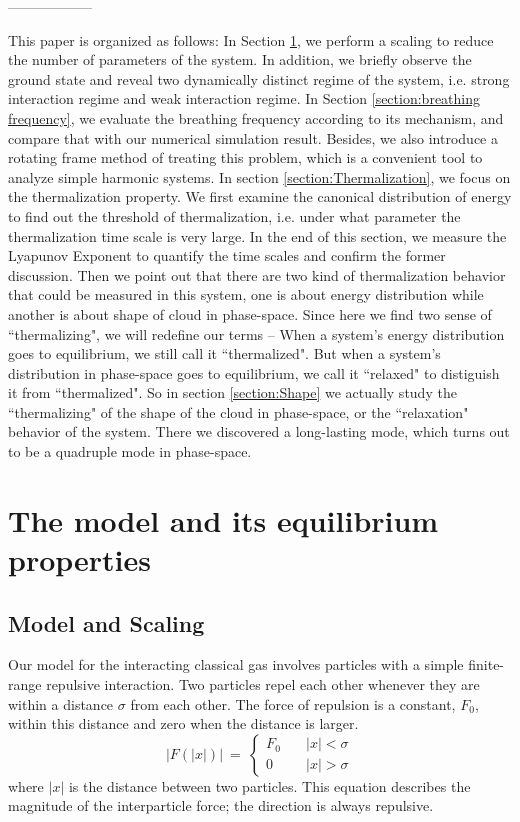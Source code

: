 \documentclass[aps,preprintnumbers,onecolumn,amsmath,amssymb,floatfix,pra]{revtex4-1}
\begin{document}
------------------


This paper is organized as follows: In Section \ref{section:preparation}, we perform a scaling to
reduce the number of parameters of the system. In addition, we briefly observe the ground state and
reveal two dynamically distinct regime of the system, i.e. strong interaction regime and weak
interaction regime. In Section \ref{section:breathing frequency}, we evaluate the breathing
frequency according to its mechanism, and compare that with our numerical simulation
result. Besides, we also introduce a rotating frame method of treating this problem, which is a
convenient tool to analyze simple harmonic systems. In section \ref{section:Thermalization}, we
focus on the thermalization property. We first examine the canonical distribution of energy to find
out the threshold of thermalization, i.e. under what parameter the thermalization time scale is very
large. In the end of this section, we measure the Lyapunov Exponent to quantify the time scales and
confirm the former discussion. Then we point out that there are two kind of thermalization behavior
that could be measured in this system, one is about energy distribution while another is about shape
of cloud in phase-space. Since here we find two sense of ``thermalizing", we will redefine our terms
-- When a system's energy distribution goes to equilibrium, we still call it ``thermalized".  But
when a system's distribution in phase-space goes to equilibrium, we call it ``relaxed" to distiguish
it from ``thermalized". So in section \ref{section:Shape} we actually study the ``thermalizing" of
the shape of the cloud in phase-space, or the ``relaxation" behavior of the system. There we
discovered a long-lasting mode, which turns out to be a quadruple mode in phase-space.




\section{The model and its equilibrium properties}\label{section:preparation}

\subsection{Model and Scaling}

Our model for the interacting classical gas involves particles with a simple finite-range repulsive
interaction.  Two particles repel each other whenever they are within a distance $\sigma$ from each
other.  The force of repulsion is a constant, $F_0$, within this distance and zero when the distance
is larger. 
%
\begin{equation}
\Big| F(|x|) \Big| ~=~ \begin{cases}
F_0  &\quad |x|<\sigma\\
0  &\quad |x|>\sigma
\end{cases}
\label{eq:preparation1}
\end{equation}
where $|x|$ is the distance between two particles.  This equation describes the magnitude of the
interparticle force; the direction is always repulsive.
\end{document}
